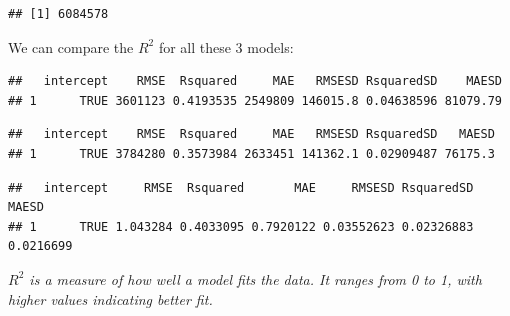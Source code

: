 \documentclass[
]{book}
\newenvironment{Shaded}{\begin{snugshade}}{\end{snugshade}}
\newcommand{\NormalTok}[1]{#1}
\newcommand{\SpecialCharTok}[1]{\textcolor[rgb]{0.81,0.36,0.00}{\textbf{#1}}}
\begin{document}
\begin{verbatim}
## [1] 6084578
\end{verbatim}

We can compare the \(R^2\) for all these 3 models:

\begin{Shaded}
\end{Shaded}

\begin{verbatim}
##   intercept    RMSE  Rsquared     MAE   RMSESD RsquaredSD    MAESD
## 1      TRUE 3601123 0.4193535 2549809 146015.8 0.04638596 81079.79
\end{verbatim}

\begin{Shaded}
\end{Shaded}

\begin{verbatim}
##   intercept    RMSE  Rsquared     MAE   RMSESD RsquaredSD   MAESD
## 1      TRUE 3784280 0.3573984 2633451 141362.1 0.02909487 76175.3
\end{verbatim}

\begin{Shaded}
\end{Shaded}

\begin{verbatim}
##   intercept     RMSE  Rsquared       MAE     RMSESD RsquaredSD     MAESD
## 1      TRUE 1.043284 0.4033095 0.7920122 0.03552623 0.02326883 0.0216699
\end{verbatim}

\emph{\(R^2\) is a measure of how well a model fits the data. It ranges from 0 to 1, with higher values indicating better fit.}
\end{document}
